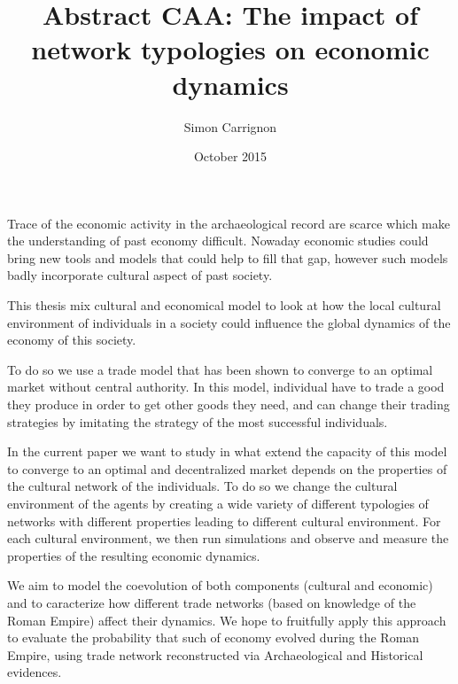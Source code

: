 \documentclass[a4paper]{article}
\title{Abstract CAA: The impact of network typologies on economic dynamics}
\author{Simon Carrignon}
\date{October 2015}
\begin{document}
Trace of the economic activity in the archaeological record are scarce which make the understanding of past economy difficult. Nowaday economic studies could bring new tools and models that could help to fill that gap, however such models badly incorporate cultural aspect of past society.

This thesis mix cultural and economical model to look at how the local cultural environment of individuals in a society could influence the global dynamics of the economy of this society.

To do so we use a trade model that has been shown to converge to an optimal market without central authority. In this model, individual have to trade a good they produce in order to get other goods they need, and can change their trading strategies by imitating the strategy of the most successful individuals. 

In the current paper we want to study in what extend the capacity of this model to converge to an optimal and decentralized market depends on the properties of the cultural network of the individuals. To do so we change the cultural environment of the agents by creating a wide variety of different typologies of networks with different properties leading to different cultural environment. For each cultural environment, we then run simulations and observe and measure the properties of the resulting economic dynamics. 

We aim to model the coevolution of both components (cultural and economic) and to caracterize how different trade networks (based on knowledge of the Roman Empire) affect their dynamics. We hope to fruitfully apply this approach to evaluate the probability that such of economy evolved during the Roman Empire, using trade network reconstructed via Archaeological and Historical evidences.
\end{document}
